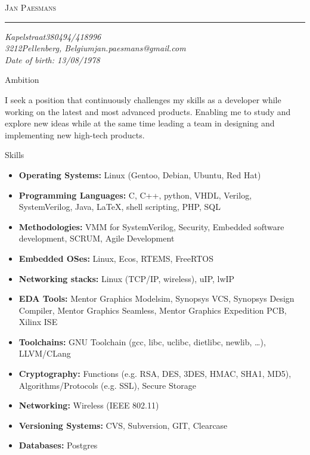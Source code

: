 \documentclass[12pt,oneside]{article}
\makeatletter
\newcommand{\name}{Jan Paesmans}
\newcommand{\street}{Kapelstraat}
\newcommand{\houseno}{38}
\newcommand{\postalcode}{3212}
\newcommand{\city}{Pellenberg}
\newcommand{\country}{Belgium}
\newcommand{\phone}{0494/418996}
\newcommand{\email}{jan.paesmans@gmail.com}
\newcommand{\birthday}{13/08/1978}
\newcommand{\bigname}[1]{
	\begin{center}\selectfont\Huge\scshape#1\end{center}
}
\newenvironment{ressection}[1]{
	\vspace{5pt}
	{\selectfont\Large#1}
	\begin{itemize}
	\vspace{5pt}
}{
	\end{itemize}
}
\newcommand{\ambition}[1]{
	\vspace{5pt}
	{\selectfont\Large Ambition}
	\vspace{5pt}
	\begin{flushleft} #1 \end{flushleft}
	\vspace{5pt}
}
\newcommand{\resitem}[1]{
	\vspace{-4pt}
	\item \begin{flushleft} #1 \end{flushleft}
}
\makeatother
\begin{document}
\fancyhf{}\renewcommand{\headrulewidth}{0pt}

 \selectfont

\bigname{\name}

\vspace{-8pt} \rule{\textwidth}{1pt}

\vspace{-1pt} {\itshape \street \houseno \hfill \phone} \\
\vspace{-1pt} {\itshape \postalcode \city, \country \hfill \email} \\
\vspace{-1pt} {\itshape \hfill Date of birth: \birthday} \\

\vspace{8pt}

\ambition{
I seek a position that continuously challenges my skills as a
developer while working on the latest and most advanced products. Enabling
me to study and explore new ideas while at the same time leading a team in 
designing and implementing new high-tech products.}

\begin{ressection}{Skills}
	\resitem{\textbf{Operating Systems:} Linux (Gentoo, Debian, Ubuntu, Red Hat)}
	\resitem{\textbf{Programming Languages:} C, C++, python, VHDL, Verilog, SystemVerilog, Java, \LaTeX, shell scripting, PHP, SQL}
	\resitem{\textbf{Methodologies:} VMM for SystemVerilog, Security, Embedded software development, SCRUM, Agile Development}
	\resitem{\textbf{Embedded OSes:} Linux, Ecos, RTEMS, FreeRTOS}
	\resitem{\textbf{Networking stacks:} Linux (TCP/IP, wireless), uIP, lwIP}
	\resitem{\textbf{EDA Tools:} Mentor Graphics Modelsim, Synopsys VCS, Synopsys Design Compiler, Mentor Graphics Seamless, Mentor Graphics Expedition PCB, Xilinx ISE}
	\resitem{\textbf{Toolchains:} GNU Toolchain (gcc, libc, uclibc, dietlibc, newlib, \dots), LLVM/CLang}
	\resitem{\textbf{Cryptography:} Functions (e.g. RSA, DES, 3DES, HMAC, SHA1, MD5), Algorithms/Protocols (e.g. SSL), Secure Storage}
	\resitem{\textbf{Networking:} Wireless (IEEE 802.11)}
	\resitem{\textbf{Versioning Systems:} CVS, Subversion, GIT, Clearcase}
	\resitem{\textbf{Databases:} Postgres}
\end{ressection}
\end{document}
